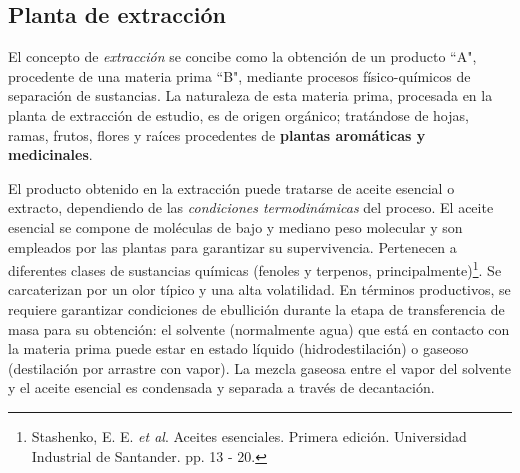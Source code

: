 \begin{center}
	\section{Planta de extracci\'on}
\end{center}

\noindent
\justify

El concepto de \textit{extracci\'on} se concibe como la obtenci\'on de un producto ``A", procedente de una materia prima ``B", mediante procesos f\'isico-qu\'imicos de separaci\'on de sustancias. La naturaleza de esta materia prima, procesada en la planta de extracci\'on de estudio, es de origen org\'anico; trat\'andose de hojas, ramas, frutos, flores y ra\'ices procedentes de \textbf{plantas arom\'aticas y medicinales}.



\newpage

\noindent
\justify

El producto obtenido en la extracci\'on puede tratarse de aceite esencial o extracto, dependiendo de las \textit{condiciones termodin\'amicas} del proceso. El aceite esencial se compone de mol\'eculas de bajo y mediano peso molecular y son empleados por las plantas para garantizar su supervivencia. Pertenecen a diferentes clases de sustancias qu\'imicas (fenoles y terpenos, principalmente)\footnote{Stashenko, E. E. \textit{et al}. Aceites esenciales. Primera edici\'on. Universidad Industrial de Santander. pp. 13 - 20.}. Se carcaterizan por un olor t\'ipico y una alta volatilidad. En t\'erminos productivos, se requiere garantizar condiciones de ebullici\'on durante la etapa de transferencia de masa para su obtenci\'on: el solvente (normalmente agua) que est\'a en contacto con la materia prima puede estar en estado l\'iquido (hidrodestilaci\'on) o gaseoso (destilaci\'on por arrastre con vapor). La mezcla gaseosa entre el vapor del solvente y el aceite esencial es condensada y separada a trav\'es de decantaci\'on.

\noindent
\justify

